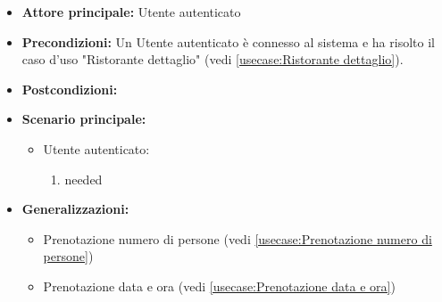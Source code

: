 \label{usecase:Ristorante prenotazione}
\begin{itemize}
\item \textbf{Attore principale:} Utente autenticato
\item \textbf{Precondizioni:}
Un Utente autenticato è connesso al sistema e ha risolto il caso d'uso "Ristorante dettaglio" (vedi \autoref{usecase:Ristorante dettaglio}).
\item \textbf{Postcondizioni:}
\item \textbf{Scenario principale:}
\begin{itemize}
\item Utente autenticato:
\begin{enumerate}
\item needed
\end{enumerate}
\end{itemize}
\item \textbf{Generalizzazioni:}
\begin{itemize}
\item Prenotazione numero di persone (vedi \autoref{usecase:Prenotazione numero di persone})\item Prenotazione data e ora (vedi \autoref{usecase:Prenotazione data e ora})
\end{itemize}
\end{itemize}